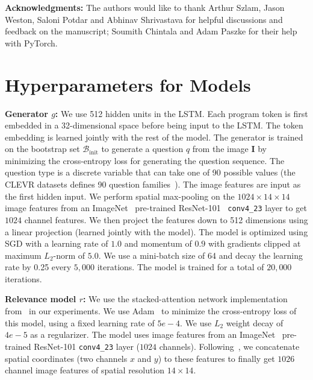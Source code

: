 \documentclass[10pt,twocolumn,letterpaper]{article}
\newcommand{\image}{\mathbf{I}}
\newcommand{\bootstrap}{\mathcal{B}_{\mathrm{init}}}
\begin{document}
 


\par \noindent \textbf{Acknowledgments:} The authors would like to thank Arthur Szlam, Jason Weston, Saloni Potdar and Abhinav Shrivastava for helpful discussions and feedback on the manuscript; Soumith Chintala and Adam Paszke for their help with PyTorch.

{\small


}
\newpage
\appendix
\section{Hyperparameters for Models}
\par \noindent \textbf{Generator $g$:} We use 512 hidden units in the LSTM. Each program token is first embedded in a 32-dimensional space before being input to the LSTM. The token embedding is learned jointly with the rest of the model. The generator is trained on the bootstrap set $\bootstrap$ to generate a question $q$ from the image $\image$ by minimizing the cross-entropy loss for generating the question sequence. The question type is a discrete variable that can take one of 90 possible values (the CLEVR datasets defines 90 question families~\cite{johnson16clevr}). The image features are input as the first hidden input. We perform spatial max-pooling on the $1024 \times 14 \times 14$ image features from an ImageNet~\cite{ILSVRC15} pre-trained ResNet-101~\cite{he2016deep} \texttt{conv4\_23} layer to get $1024$ channel features. We then project the features down to 512 dimensions using a linear projection (learned jointly with the model). The model is optimized using SGD with a learning rate of $1.0$ and momentum of $0.9$ with gradients clipped at maximum $L_2$-norm of $5.0$. We use a mini-batch size of 64 and decay the learning rate by 0.25 every $5,000$ iterations. The model is trained for a total of $20,000$ iterations.

\par \noindent \textbf{Relevance model $r$:} We use the stacked-attention network implementation from~\cite{yang16stacked} in our experiments. We use Adam~\cite{kingma2014adam} to minimize the cross-entropy loss of this model, using a fixed learning rate of $5e-4$. We use $L_2$ weight decay of $4e-5$ as a regularizer. The model uses image features from an ImageNet~\cite{ILSVRC15} pre-trained ResNet-101 \texttt{conv4\_23} layer ($1024$ channels). Following~\cite{santoro17relational}, we concatenate spatial coordinates (two channels $x$ and $y$) to these features to finally get $1026$ channel image features of spatial resolution $14 \times 14$.
\end{document}
